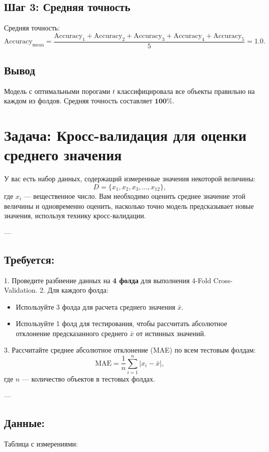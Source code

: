 \subsection*{Шаг 3: Средняя точность}
Средняя точность:
\[
    \text{Accuracy}_{\text{mean}} = \frac{\text{Accuracy}_1 + \text{Accuracy}_2 + \text{Accuracy}_3 + \text{Accuracy}_4 + \text{Accuracy}_5}{5} = 1.0.
\]

\subsection*{Вывод}
Модель с оптимальными порогами \( t \) классифицировала все объекты правильно на каждом из фолдов. Средняя точность составляет \( \mathbf{100\%} \).


\section*{Задача: Кросс-валидация для оценки среднего значения}

У вас есть набор данных, содержащий измеренные значения некоторой величины:
\[
    D = \{ x_1, x_2, x_3, \dots, x_{12} \},
\]
где \(x_i\) — вещественное число. Вам необходимо оценить среднее значение этой величины и одновременно оценить, насколько точно модель предсказывает новые значения, используя технику кросс-валидации.

---

\subsection*{Требуется:}
1. Проведите разбиение данных на \textbf{4 фолда} для выполнения 4-Fold Cross-Validation.
2. Для каждого фолда:
\begin{itemize}
    \item Используйте 3 фолда для расчета среднего значения \(\bar{x}\).
    \item Используйте 1 фолд для тестирования, чтобы рассчитать абсолютное отклонение предсказанного среднего \(\bar{x}\) от истинных значений.
\end{itemize}
3. Рассчитайте среднее абсолютное отклонение (MAE) по всем тестовым фолдам:
\[
    \text{MAE} = \frac{1}{n} \sum_{i=1}^{n} \lvert x_i - \bar{x} \rvert,
\]
где \(n\) — количество объектов в тестовых фолдах.

---

\subsection*{Данные:}
Таблица с измерениями:

